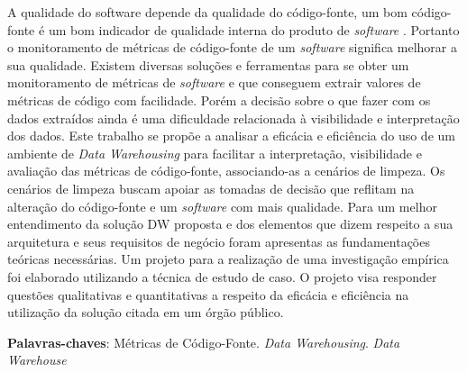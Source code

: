 \begin{resumo}




A qualidade do software depende da qualidade do código-fonte, um bom código-fonte é um bom indicador de
qualidade interna do produto de \textit{software} \cite{ISO25023}. Portanto o monitoramento de métricas de código-fonte de um \textit{software} significa melhorar a sua qualidade. Existem diversas soluções e ferramentas para se obter um monitoramento de métricas de \textit{software} e que conseguem extrair valores de métricas de código com facilidade. Porém a decisão sobre o que fazer com os dados extraídos ainda é uma
dificuldade relacionada à visibilidade e interpretação dos dados. Este trabalho se propõe a analisar a
eficácia e eficiência do uso de um ambiente de \textit{Data Warehousing} para facilitar a interpretação, visibilidade e avaliação das métricas de código-fonte, associando-as a cenários de limpeza. Os cenários de limpeza buscam apoiar as tomadas de decisão que reflitam na alteração do código-fonte e um \textit{software} com mais qualidade. Para um melhor entendimento da solução DW proposta e dos elementos que dizem respeito a sua arquitetura e seus requisitos de negócio foram apresentas as fundamentações teóricas necessárias. Um projeto para a realização de uma investigação empírica foi elaborado utilizando a técnica de estudo de caso. O projeto visa responder questões qualitativas e quantitativas a respeito da eficácia e eficiência na utilização da solução citada em um órgão público.
 
 

 \vspace{\onelineskip}
    
 \noindent
 \textbf{Palavras-chaves}: Métricas de Código-Fonte. \textit{Data Warehousing}. \textit{Data Warehouse}
\end{resumo}
